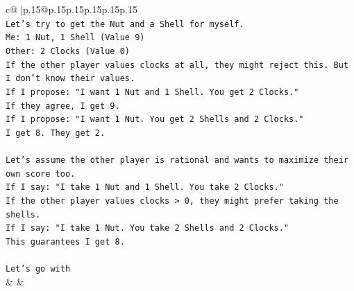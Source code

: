 \documentclass{article}
\begin{document}
{\begin{supertabular}{c@{$\;$}|p{.15\linewidth}@{}p{.15\linewidth}p{.15\linewidth}p{.15\linewidth}p{.15\linewidth}p{.15\linewidth}}
{{{\\ 
\texttt{Let's try to get the Nut and a Shell for myself.} \\
\texttt{Me: 1 Nut, 1 Shell (Value 9)} \\
\texttt{Other: 2 Clocks (Value 0)} \\
\texttt{If the other player values clocks at all, they might reject this. But I don't know their values.} \\
\texttt{If I propose: "I want 1 Nut and 1 Shell. You get 2 Clocks."} \\
\texttt{If they agree, I get 9.} \\
\texttt{If I propose: "I want 1 Nut. You get 2 Shells and 2 Clocks."} \\
\texttt{I get 8. They get 2.} \\
\\ 
\texttt{Let's assume the other player is rational and wants to maximize their own score too.} \\
\texttt{If I say: "I take 1 Nut and 1 Shell. You take 2 Clocks."} \\
\texttt{If the other player values clocks > 0, they might prefer taking the shells.} \\
\texttt{If I say: "I take 1 Nut. You take 2 Shells and 2 Clocks."} \\
\texttt{This guarantees I get 8.} \\
\\ 
\texttt{Let's go with} \\
            }
        }
    }
    & & \\ \\


\end{supertabular}}
\end{document}
